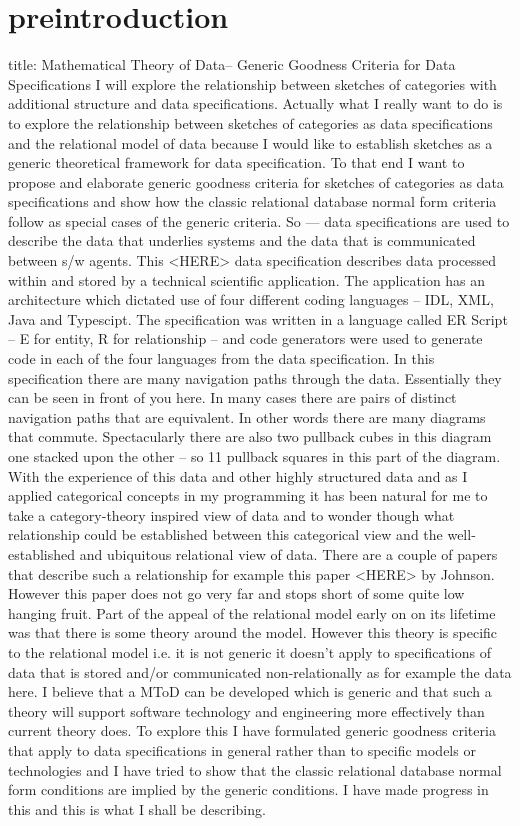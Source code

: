 \documentclass[12pt,a4paper]{article}
\theoremstyle{remark}
\begin{document}
\section{preintroduction}
\note
title: Mathematical Theory of Data-- Generic Goodness Criteria for Data Specifications
\note I will explore the relationship between sketches of categories with additional structure and data specifications. 
Actually what I really want to do is to explore the relationship between sketches of categories as data specifications and the relational model of data
because I would like to establish sketches as a generic theoretical framework for data specification.
To that end I want to propose and elaborate  generic goodness criteria for sketches of categories as data specifications and  show how  the classic relational database normal form criteria follow as special cases of the generic criteria. 
\note
So --- data specifications are used to describe the data that underlies systems and the data that is communicated between s/w agents.
This <HERE> data specification describes data processed within and stored by a technical scientific application. 
The application has an architecture which dictated use of  four different coding languages -- IDL, XML, Java and Typescipt.  
The specification was  written in a language called ER Script -- E for entity, R for relationship -- 
and code generators were used to generate code  in each of the four languages from the data specification.
\note
In this specification there are many navigation paths through the data. Essentially they can be seen in front of you here. 
In many cases there are pairs of distinct navigation paths that are equivalent. In other words there are many diagrams that commute.
\note
Spectacularly there are also two pullback cubes in this diagram one stacked upon the other -- so 11 pullback squares in this part of the diagram.
\note 
With the experience of this data and other highly structured data and as I applied categorical concepts in my programming 
it has been natural for me to take a category-theory inspired view of data
and to wonder though what relationship could be established between this categorical view and the well-established and ubiquitous relational view of data.
\note 
There are a couple of papers that describe such a relationship for example this paper <HERE> by Johnson. However this paper does not go very far and stops short of some quite low hanging fruit.
\note 
Part of the appeal of the relational model early on on its lifetime was that there is some theory around the model. 
However this theory is specific to the relational model i.e. it is not generic it doesn't apply to specifications of data that is stored and/or communicated non-relationally as for example the data here.
\note
I believe that a MToD can be developed which is generic and that such a theory will support software technology and engineering more effectively than current theory does. To explore this I have formulated generic goodness criteria that apply to data specifications in general rather than to specific models or technologies and I have tried to show that the classic relational database normal form conditions are implied by the generic conditions. I have made progress in this and this is what I shall be describing.
\end{document}

